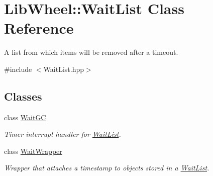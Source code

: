 \hypertarget{classLibWheel_1_1WaitList}{
\section{\-Lib\-Wheel\-:\-:\-Wait\-List \-Class \-Reference}
\label{classLibWheel_1_1WaitList}
}


\-A list from which items will be removed after a timeout.  




{\ttfamily \#include $<$\-Wait\-List.\-hpp$>$}

\subsection*{\-Classes}
\begin{DoxyCompactItemize}
\item 
class \hyperlink{classLibWheel_1_1WaitList_1_1WaitGC}{\-Wait\-G\-C}
\begin{DoxyCompactList}\small\item\em \-Timer interrupt handler for \hyperlink{classLibWheel_1_1WaitList}{\-Wait\-List}. \end{DoxyCompactList}\item 
class \hyperlink{classLibWheel_1_1WaitList_1_1WaitWrapper}{\-Wait\-Wrapper}
\begin{DoxyCompactList}\small\item\em \-Wrapper that attaches a timestamp to objects stored in a \hyperlink{classLibWheel_1_1WaitList}{\-Wait\-List}. \end{DoxyCompactList}\end{DoxyCompactItemize}
